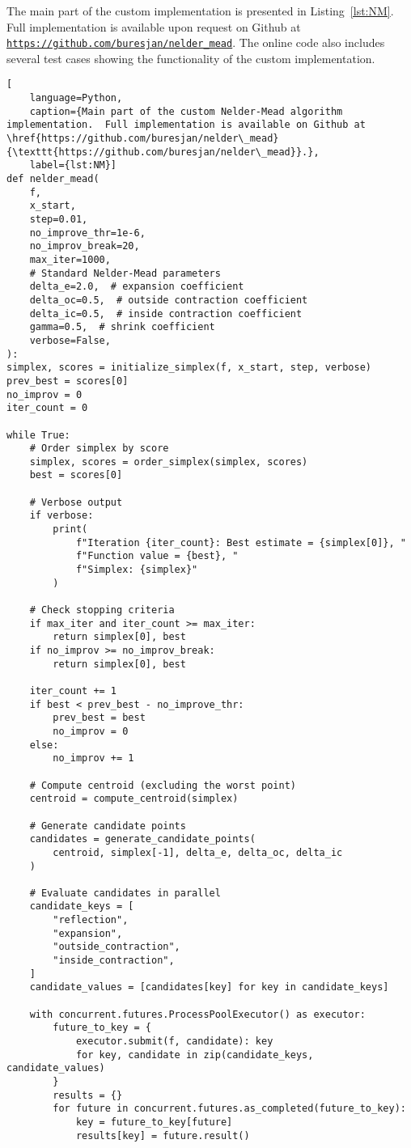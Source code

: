 The main part of the custom implementation is presented in Listing~\ref{lst:NM}. Full implementation is available upon request on Github at \href{https://github.com/buresjan/nelder\_mead}{\texttt{https://github.com/buresjan/nelder\_mead}}. The online code also includes several test cases showing the functionality of the custom implementation.

\newpage
\begin{lstlisting}[
	language=Python,
	caption={Main part of the custom Nelder-Mead algorithm implementation.  Full implementation is available on Github at \href{https://github.com/buresjan/nelder\_mead}{\texttt{https://github.com/buresjan/nelder\_mead}}.},
	label={lst:NM}]
def nelder_mead(
	f,
	x_start,
	step=0.01,
	no_improve_thr=1e-6,
	no_improv_break=20,
	max_iter=1000,
	# Standard Nelder-Mead parameters
	delta_e=2.0,  # expansion coefficient
	delta_oc=0.5,  # outside contraction coefficient
	delta_ic=0.5,  # inside contraction coefficient
	gamma=0.5,  # shrink coefficient
	verbose=False,
):
simplex, scores = initialize_simplex(f, x_start, step, verbose)
prev_best = scores[0]
no_improv = 0
iter_count = 0

while True:
	# Order simplex by score
	simplex, scores = order_simplex(simplex, scores)
	best = scores[0]

	# Verbose output
	if verbose:
		print(
			f"Iteration {iter_count}: Best estimate = {simplex[0]}, "
			f"Function value = {best}, "
			f"Simplex: {simplex}"
		)

	# Check stopping criteria
	if max_iter and iter_count >= max_iter:
		return simplex[0], best
	if no_improv >= no_improv_break:
		return simplex[0], best

	iter_count += 1
	if best < prev_best - no_improve_thr:
		prev_best = best
		no_improv = 0
	else:
		no_improv += 1
	
	# Compute centroid (excluding the worst point)
	centroid = compute_centroid(simplex)
	
	# Generate candidate points
	candidates = generate_candidate_points(
		centroid, simplex[-1], delta_e, delta_oc, delta_ic
	)
	
	# Evaluate candidates in parallel
	candidate_keys = [
		"reflection",
		"expansion",
		"outside_contraction",
		"inside_contraction",
	]
	candidate_values = [candidates[key] for key in candidate_keys]
	
	with concurrent.futures.ProcessPoolExecutor() as executor:
		future_to_key = {
			executor.submit(f, candidate): key
			for key, candidate in zip(candidate_keys, candidate_values)
		}
		results = {}
		for future in concurrent.futures.as_completed(future_to_key):
			key = future_to_key[future]
			results[key] = future.result()
	

\end{lstlisting}
